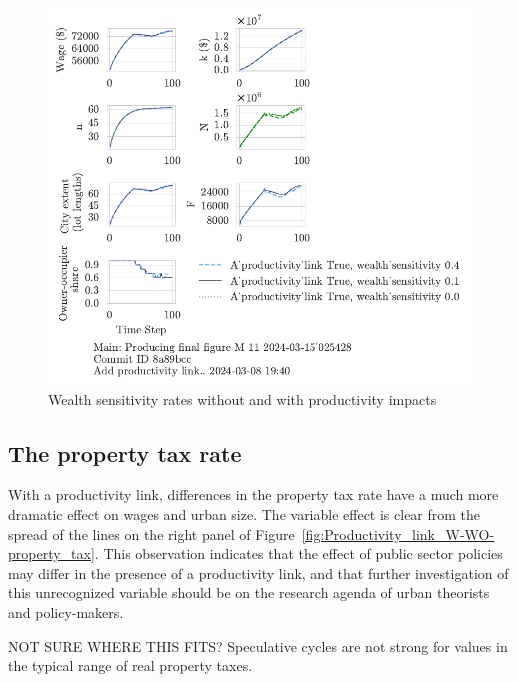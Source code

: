 {\begin{figure}[h!tb]
    \includegraphics[scale=.75, trim={0 1.4cm 4.75cm 0},clip]{fig/With-productivity_link-wealth_sensitivity-025428.pdf} 
    \caption{Wealth sensitivity rates without and with productivity impacts}
    \label{fig:Productivity_link_W-WO-wealth}
\end{figure}


\newpage
\subsection{The property tax rate}

With a productivity link, differences in the property tax rate have a much more dramatic effect on wages and urban size. The variable effect is clear from the spread of the lines on the right panel of Figure~\ref{fig:Productivity_link_W-WO-property_tax}.  This observation indicates that the effect of public sector policies may differ in the presence of a productivity link, and that further investigation of this unrecognized variable should be on the research agenda of urban theorists and policy-makers.

{\color{red} NOT SURE WHERE THIS FITS? Speculative cycles are not strong for values in the typical range of real property taxes.}

}
